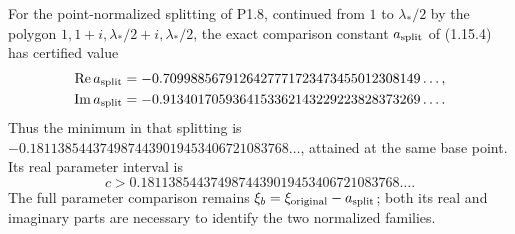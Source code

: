 \begin{theorem}
For the point-normalized splitting of P1.8, continued from
$1$ to $\lambda_*/2$ by the polygon
$1,1+i,\lambda_*/2+i,\lambda_*/2$, the exact comparison constant
$a_{\rm split}$ of (1.15.4) has certified value
\[
\begin{split}
 \operatorname{Re}a_{\rm split}
   &=-0.7099885679126427771723473455012308149\ldots,\\
 \operatorname{Im}a_{\rm split}
   &=-0.9134017059364153362143229223828373269\ldots.
\end{split}
\]
Thus the minimum in that splitting is
$-0.1811385443749874439019453406721083768\ldots$,
attained at the same base point.  Its real parameter interval is
\[
 c>0.1811385443749874439019453406721083768\ldots.
\]
The full parameter comparison remains
$\xi_b=\xi_{\rm original}-a_{\rm split}$; both its real and imaginary
parts are necessary to identify the two normalized families.
\end{theorem}
